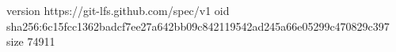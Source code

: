 version https://git-lfs.github.com/spec/v1
oid sha256:6c15fcc1362badcf7ee27a642bb09c842119542ad245a66e05299c470829c397
size 74911
